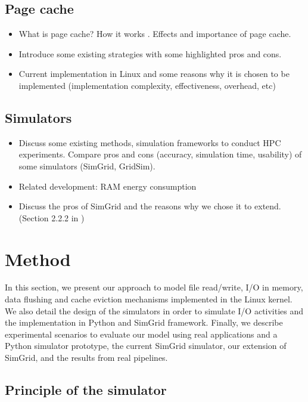 \documentclass[conference]{IEEEtran}
\begin{document}
		\subsection{Page cache}
			\begin{itemize}
				\item What is page cache? How it works \cite{linuxdev3rd2010}. Effects and importance of page cache.
				\item Introduce some existing strategies with some highlighted pros and cons.
				\item Current implementation in Linux and some reasons why it is chosen to be implemented (implementation complexity, effectiveness, overhead, etc) \cite{linuxdev3rd2010}
			\end{itemize}									

		\subsection{Simulators}
			\begin{itemize}
				\item Discuss some existing methods, simulation frameworks to conduct HPC experiments. Compare pros and cons (accuracy, simulation time, usability) of some simulators (SimGrid, GridSim).
				\item Related development: RAM energy consumption \cite{gill2019} \cite{ouarnoughi2017} 
				\item Discuss the pros of SimGrid and the reasons why we chose it to extend. (Section 2.2.2 in \cite{casanova2014})
			\end{itemize}
			
	\section{Method}
		In this section, we present our approach to model file read/write, 
		I/O in memory, data flushing and cache eviction mechanisms 
		implemented in the Linux kernel. 
		We also detail the design of the simulators in order to simulate 
		I/O activities and the implementation in Python and SimGrid framework. 
		Finally, we describe experimental scenarios to evaluate our model using 
		real applications and a Python simulator prototype, the current SimGrid 
		simulator, our extension of SimGrid, and the results from real pipelines.

		\subsection{Principle of the simulator}
	
\end{document}

